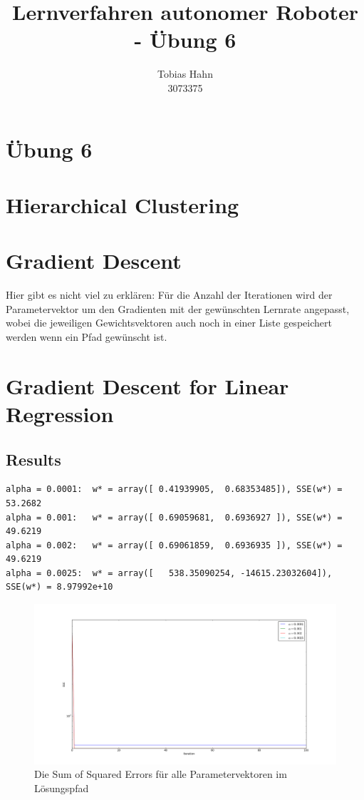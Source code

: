 \documentclass{article}
\title{Lernverfahren autonomer Roboter - Übung 6}
\author{Tobias Hahn\\ 3073375}
\begin{document}
\maketitle
\newpage
\section*{Übung 6}
\section{Hierarchical Clustering}

\section{Gradient Descent}
Hier gibt es nicht viel zu erklären: Für die Anzahl der Iterationen wird der Parametervektor um den Gradienten mit der gewünschten Lernrate angepasst, wobei die jeweiligen Gewichtsvektoren auch noch in einer Liste gespeichert werden wenn ein Pfad gewünscht ist.

\section{Gradient Descent for Linear Regression}
\subsection{Results}
\begin{lstlisting}[title=Konsolenoutput]
alpha = 0.0001:	 w* = array([ 0.41939905,  0.68353485]), SSE(w*) = 53.2682
alpha = 0.001:	 w* = array([ 0.69059681,  0.6936927 ]), SSE(w*) = 49.6219
alpha = 0.002:	 w* = array([ 0.69061859,  0.6936935 ]), SSE(w*) = 49.6219
alpha = 0.0025:	 w* = array([   538.35090254, -14615.23032604]), SSE(w*) = 8.97992e+10
\end{lstlisting}

\begin{figure}[h]
    \centering
    \includegraphics[width=\textwidth]{linear_regression.png}
    \caption{Die Sum of Squared Errors für alle Parametervektoren im Lösungspfad}
    \label{fig:sse}
\end{figure}
\FloatBarrier
\end{document}

